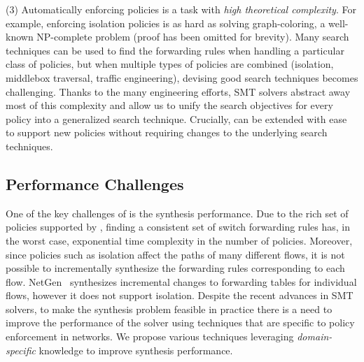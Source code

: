 (3) Automatically enforcing policies is a task with
\emph{high theoretical complexity}. 
For example, enforcing isolation policies
is as hard as solving
graph-coloring, a well-known
NP-complete problem (proof has been omitted for brevity).
Many search techniques can be used to find the forwarding rules when
handling a particular class of policies, but when multiple types of
policies are combined (isolation, middlebox traversal, traffic
engineering), devising good search techniques becomes challenging.
Thanks to the many engineering efforts, SMT solvers abstract away most
of this complexity and allow us to unify the search objectives for
every policy into a generalized search technique.
Crucially, \Name can be extended with ease to
support new policies without requiring changes to the underlying search
techniques.

\subsection{Performance Challenges} \label{sec:performance}

One of the key challenges of \Name is the synthesis
performance. 
Due to the rich set of policies supported by \Name,
finding a consistent set of switch forwarding rules 
has, in the worst case, exponential time complexity in
the number of policies.
Moreover, since policies such as isolation affect
the paths of many different flows, it is not possible to incrementally synthesize
the forwarding rules corresponding to each flow. NetGen~\cite{netgen}
synthesizes incremental changes to forwarding tables for individual
flows, however 
it does not support isolation.
Despite the recent advances in SMT solvers, to make
the synthesis problem feasible in practice
there is a need to improve the performance of the solver
using techniques that are specific to policy enforcement in networks.
We propose various techniques leveraging
\emph{domain-specific} knowledge to improve synthesis performance. 

